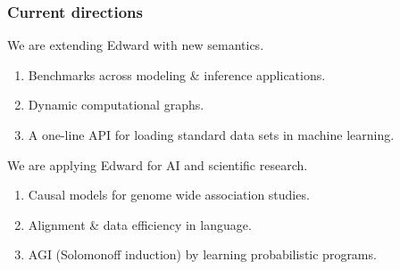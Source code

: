 \documentclass[10pt,
               xcolor={usenames,dvipsnames},
               hyperref={colorlinks,linktoc=all,citecolor=Plum,linkcolor=MidnightBlue,urlcolor=MidnightBlue},noamssymb]{beamer}
\begin{document}
\begin{frame}
\frametitle{Current directions}

We are extending Edward with new semantics.
\begin{enumerate}
\item
Benchmarks across modeling \& inference applications.
\item
Dynamic computational graphs.
\item
A one-line API for loading standard data sets in machine learning.
\end{enumerate}
\vspace{3ex}

We are applying Edward for AI and scientific research.
\begin{enumerate}
\item
Causal models for genome wide association studies. 
\item
Alignment \& data efficiency in language.
\item
AGI (Solomonoff induction) by learning probabilistic programs.
\end{enumerate}
\end{frame}
\end{document}
